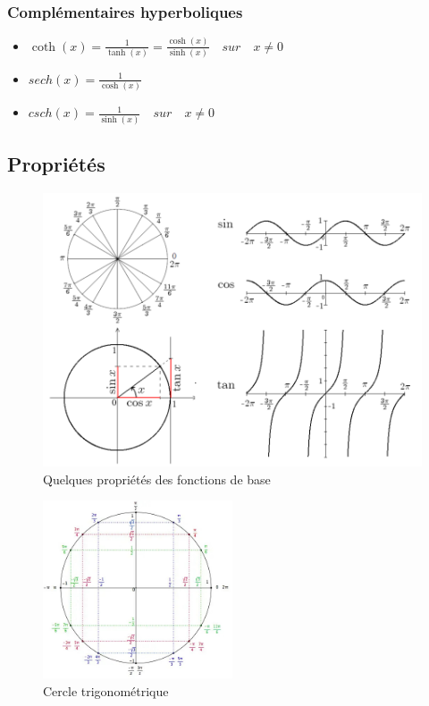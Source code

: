 \documentclass[12]{article}%
\theoremstyle{plain}
\theoremstyle{definition}
\theoremstyle{remark}
\begin{document}
\subsubsection{Complémentaires hyperboliques}
\begin{itemize}
	\item \( \boxed{\coth(x) = \frac{1}{\tanh(x)} = \frac{\cosh(x)}{\sinh(x)} } \quad sur \quad x \neq 0 \)
	\item \( \boxed{sech(x) = \frac{1}{\cosh(x)}} \)
	\item \( \boxed{csch(x) = \frac{1}{\sinh(x)}} \quad sur \quad x \neq 0 \)
\end{itemize}

\subsection{Propriétés}
\begin{figure}[h] %
	\centering
	\includegraphics[width=1\textwidth]{./images/trigonometrie.png} %
	\caption{Quelques propriétés des fonctions de base}
	\label{fig:trigonometrie} %
\end{figure}

\begin{figure}[h] %
	\centering
	\includegraphics[width=0.5\textwidth]{./images/cercle-trigonometrique.jpg} %
	\caption{Cercle trigonométrique}
	\label{fig:cercletrigo} %
\end{figure}
\end{document}

